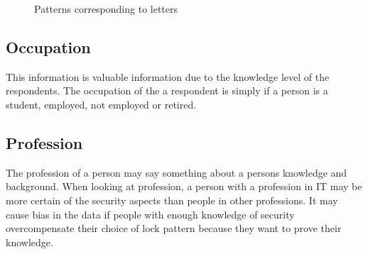         \begin{figure}[H]
          \centering
          \vspace{0.2cm}
          \vspace{0.2cm}
          \caption{Patterns corresponding to letters}
          \label{fig:letters2}
        \end{figure}

      \subsection*{Occupation}
      This information is valuable information due to the knowledge level of the respondents. The occupation of the a respondent is simply if a person is a student, employed, not employed or retired.

      \subsection*{Profession}
      The profession of a person may say something about a persons knowledge and background. When looking at profession, a person with a profession in IT may be more certain of the security aspects than people in other professions. It may cause bias in the data if people with enough knowledge of security overcompensate their choice of lock pattern because they want to prove their knowledge.  

